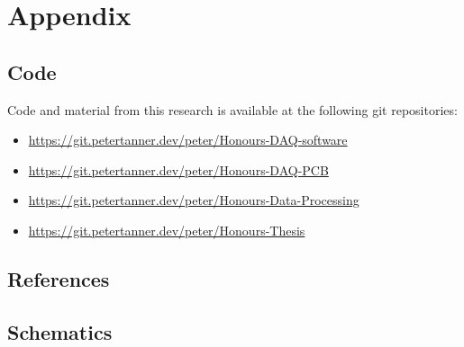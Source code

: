 \documentclass{report}
\begin{document}
\newpage

\section{Appendix}

\subsection{Code}

Code and material from this research is available at the following git repositories:

\begin{itemize}
  \item \url{https://git.petertanner.dev/peter/Honours-DAQ-software}
  \item \url{https://git.petertanner.dev/peter/Honours-DAQ-PCB}
  \item \url{https://git.petertanner.dev/peter/Honours-Data-Processing}
  \item \url{https://git.petertanner.dev/peter/Honours-Thesis}
\end{itemize}

\subsection{References}

\printbibliography[heading=none]

\subsection{Schematics}

\end{document}
